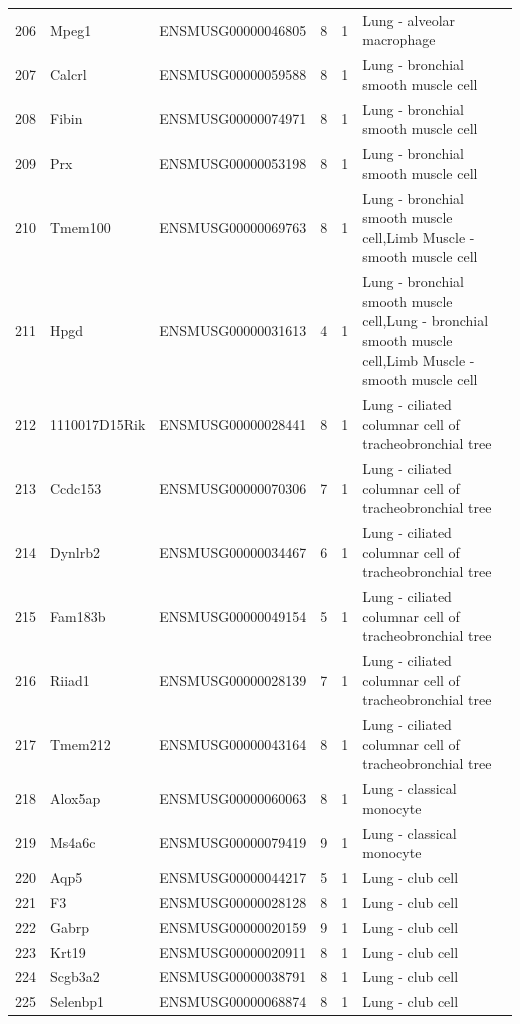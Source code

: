 \begin{table}[ht]
{\begin{tabular}{lllrrl}
        206 & Mpeg1 & ENSMUSG00000046805 & 8 & 1 & Lung - alveolar macrophage \\
        207 & Calcrl & ENSMUSG00000059588 & 8 & 1 & Lung - bronchial smooth muscle cell \\
        208 & Fibin & ENSMUSG00000074971 & 8 & 1 & Lung - bronchial smooth muscle cell \\
        209 & Prx & ENSMUSG00000053198 & 8 & 1 & Lung - bronchial smooth muscle cell \\
        210 & Tmem100 & ENSMUSG00000069763 & 8 & 1 & Lung - bronchial smooth muscle cell,Limb Muscle - smooth muscle cell \\
        211 & Hpgd & ENSMUSG00000031613 & 4 & 1 & Lung - bronchial smooth muscle cell,Lung - bronchial smooth muscle cell,Limb Muscle - smooth muscle cell \\
        212 & 1110017D15Rik & ENSMUSG00000028441 & 8 & 1 & Lung - ciliated columnar cell of tracheobronchial tree \\
        213 & Ccdc153 & ENSMUSG00000070306 & 7 & 1 & Lung - ciliated columnar cell of tracheobronchial tree \\
        214 & Dynlrb2 & ENSMUSG00000034467 & 6 & 1 & Lung - ciliated columnar cell of tracheobronchial tree \\
        215 & Fam183b & ENSMUSG00000049154 & 5 & 1 & Lung - ciliated columnar cell of tracheobronchial tree \\
        216 & Riiad1 & ENSMUSG00000028139 & 7 & 1 & Lung - ciliated columnar cell of tracheobronchial tree \\
        217 & Tmem212 & ENSMUSG00000043164 & 8 & 1 & Lung - ciliated columnar cell of tracheobronchial tree \\
        218 & Alox5ap & ENSMUSG00000060063 & 8 & 1 & Lung - classical monocyte \\
        219 & Ms4a6c & ENSMUSG00000079419 & 9 & 1 & Lung - classical monocyte \\
        220 & Aqp5 & ENSMUSG00000044217 & 5 & 1 & Lung - club cell \\
        221 & F3 & ENSMUSG00000028128 & 8 & 1 & Lung - club cell \\
        222 & Gabrp & ENSMUSG00000020159 & 9 & 1 & Lung - club cell \\
        223 & Krt19 & ENSMUSG00000020911 & 8 & 1 & Lung - club cell \\
        224 & Scgb3a2 & ENSMUSG00000038791 & 8 & 1 & Lung - club cell \\
        225 & Selenbp1 & ENSMUSG00000068874 & 8 & 1 & Lung - club cell \\

\end{tabular}}
\end{table}
